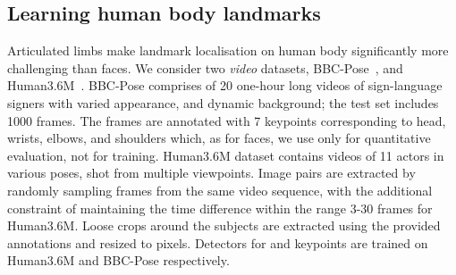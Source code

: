 \documentclass{article}
\makeatletter
\renewcommand{\paragraph}{\@startsection{paragraph}{4}{\z@}{0em}{-1em}{\normalfont\normalsize\bfseries}}
\makeatother
\begin{document}
\begin{figure*}[t]
  \vspace{-1em}
  \begin{center}
  \end{center}\vspace{-3mm}
\caption{{\bf  Invariant Localisation.} Unsupervised keypoints discovered on smallNORB test set for the \emph{car} and \emph{airplane} categories. Out of 20 learned keypoints, we show the most geometrically stable ones: they are invariant to pose, shape, and illumination. {\bf [b--c]:} elevation-vs-azimuth; {\bf[a, d]:} shape-vs-illumination (-axis-vs--axis).}\label{fig:norb}
\end{figure*}
 

\subsection{Learning human body landmarks}\label{s:humankpt}

\paragraph{Setup.}

Articulated limbs make landmark localisation on human body significantly more challenging than faces. We consider two \emph{video} datasets, BBC-Pose~\cite{Charles13}, and Human3.6M~\citep{h36m_pami}. BBC-Pose comprises of 20 one-hour long videos of sign-language signers with varied appearance, and dynamic background;
the test set includes 1000 frames. The frames are annotated with 7 keypoints corresponding to head, wrists, elbows, and shoulders which, as for faces, we use only for quantitative evaluation, not for training. Human3.6M dataset contains videos of 11 actors in various poses, shot from multiple viewpoints.
Image pairs are extracted by randomly sampling frames from the same video sequence, with the additional constraint of maintaining the time difference within the range 3-30 frames for Human3.6M. Loose crops around the subjects are extracted using the provided annotations and resized to  pixels.
Detectors for  and  keypoints are trained on Human3.6M and BBC-Pose respectively.
\end{document}
